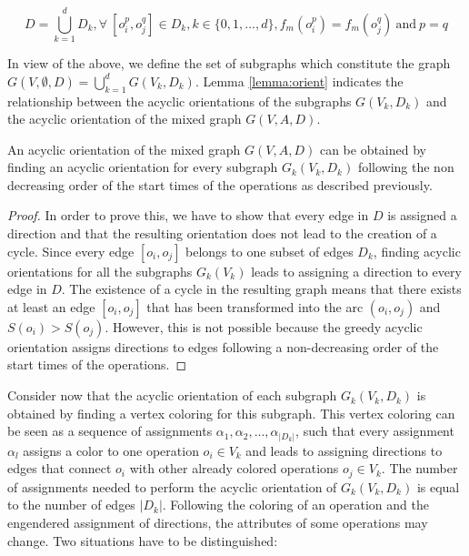 \begin{equation}
D = \bigcup_{k=1}^d D_k, \forall\ [o_i^p, o_j^q] \in D_k, k \in \{0, 1, \ldots, d\}, f_m(o_i^p)=f_m(o_j^q)\ \text{and}\ p = q
\label{eq:opsubset}
\end{equation}

In view of the above, we define the set of subgraphs which constitute the graph $G(V,\emptyset,D) = \bigcup_{k=1}^d G(V_k,D_k)$. Lemma \ref{lemma:orient} indicates the relationship between the acyclic orientations of the subgraphs $G(V_k,D_k)$ and the acyclic orientation of the mixed graph $G(V,A,D)$.

\begin{lemma}
An acyclic orientation of the mixed graph $G(V,A,D)$ can be obtained by finding an acyclic orientation for every subgraph $G_k(V_k,D_k)$ following the non decreasing order of the start times of the operations as described previously.
\label{lemma:orient}
\end{lemma}

\begin{proof}
 In order to prove this, we have to show that every edge in $D$ is assigned a	direction and that the resulting orientation does not lead to the creation of a cycle. Since every edge $[o_i, o_j]$ belongs to one subset of edges $D_k$, finding acyclic orientations for all the subgraphs $G_k(V_k)$ leads to assigning a direction to every edge in $D$. The existence of a cycle in the resulting graph means that there exists at least an edge $[o_i,o_j]$ that has been transformed into the arc $(o_i,o_j)$ and $S(o_i) > S(o_j)$. However, this is not possible because the greedy acyclic orientation assigns directions to edges following a non-decreasing order of the start times of the operations.
\end{proof}

Consider now that the acyclic orientation of each subgraph $G_k(V_k,D_k)$ is obtained by finding a vertex coloring for this subgraph. This vertex coloring can be seen as a sequence of assignments $\alpha_1, \alpha_2, \ldots, \alpha_{|D_k|}$, such that every assignment $\alpha_l$ assigns a color to one operation $o_i \in V_k$ and leads to assigning directions to edges that connect $o_i$ with other already colored operations $o_j \in V_k$. The number of assignments needed to perform the acyclic orientation of $G_k(V_k,D_k)$ is equal to the number of edges $|D_k|$. Following the coloring of an operation and the engendered assignment of directions, the attributes of some operations may change. Two situations have to be distinguished:

